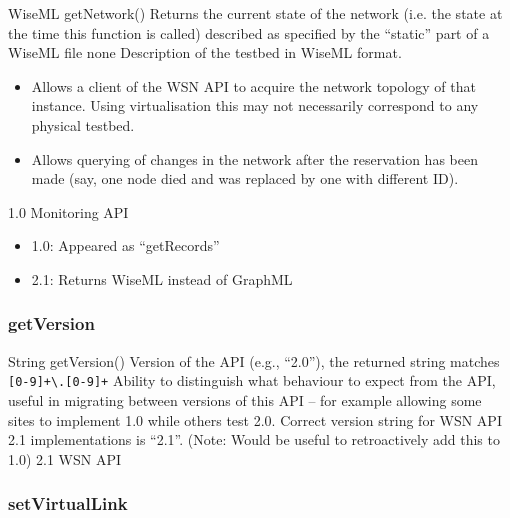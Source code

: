 \begin{apidoc}
	{WiseML getNetwork()} %
	{Returns the current state of the network (i.e. the state at the time this function is called) described as specified by the ``static'' part of a WiseML file} %
	{none} %
	{Description of the testbed in WiseML format. } %
	{\begin{itemize}
			\item Allows a client of the WSN API to acquire the network topology of that instance. Using virtualisation this may not necessarily correspond to any physical testbed.
			\item Allows querying of changes in the network after the reservation has been made (say, one node died and was replaced by one with different ID).
		\end{itemize}
	} %
	{1.0 Monitoring API
		\begin{itemize}
			\item 1.0: Appeared as ``getRecords''
			\item 2.1: Returns WiseML instead of GraphML
		\end{itemize}
	} %
\end{apidoc}

			\subsubsection{getVersion}

\begin{apidoc}
	{String getVersion()} %
	{} %
	{} %
	{Version of the API (e.g., ``2.0''), the returned string matches \lstinline{[0-9]+\.[0-9]+}} %
	{Ability to distinguish what behaviour to expect from the API, useful in migrating between versions of this API -- for example allowing some sites to implement 1.0 while others test 2.0. Correct version string for WSN API 2.1 implementations is ``2.1''. (Note: Would be useful to retroactively add this to 1.0)} %
	{2.1 WSN API} %
\end{apidoc}

			\subsubsection{setVirtualLink}
\label{sssec:setvlink}

